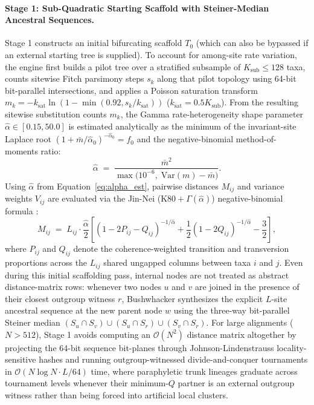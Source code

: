 \documentclass[11pt,a4paper]{article}
\begin{document}
\paragraph{Stage 1: Sub-Quadratic Starting Scaffold with Steiner-Median Ancestral Sequences.}
Stage 1 constructs an initial bifurcating scaffold $T_0$ (which can also be bypassed if an external starting tree is supplied). To account for among-site rate variation, the engine first builds a pilot tree over a stratified subsample of $K_{\text{sub}} \le 128$ taxa, counts sitewise Fitch parsimony steps $s_k$ along that pilot topology using 64-bit bit-parallel intersections, and applies a Poisson saturation transform $m_k = -k_{\text{sat}}\ln(1 - \min(0.92, s_k / k_{\text{sat}}))$ ($k_{\text{sat}} = 0.5 K_{\text{sub}}$). From the resulting sitewise substitution counts $m_k$, the Gamma rate-heterogeneity shape parameter $\hat{\alpha} \in [0.15, 50.0]$ is estimated analytically as the minimum of the invariant-site Laplace root $(1 + \bar{m}/\hat{\alpha}_0)^{-\hat{\alpha}_0} = f_0$ and the negative-binomial method-of-moments ratio:
\begin{equation}
    \hat{\alpha} \;=\; \frac{\bar{m}^2}{\max\!\big(10^{-6},\; \text{Var}(m) - \bar{m}\big)}.
    \label{eq:alpha_est}
\end{equation}
Using $\hat{\alpha}$ from Equation~\eqref{eq:alpha_est}, pairwise distances $M_{ij}$ and variance weights $V_{ij}$ are evaluated via the Jin-Nei ($\text{K80}+\Gamma(\hat{\alpha})$) negative-binomial formula \citep{jin1990limitations}:
\begin{equation}
    M_{ij} \;=\; L_{ij} \cdot \frac{\hat{\alpha}}{2}\left[ (1 - 2P_{ij} - Q_{ij})^{-1/\hat{\alpha}} + \frac{1}{2}(1 - 2Q_{ij})^{-1/\hat{\alpha}} - \frac{3}{2} \right],
    \label{eq:jin_nei}
\end{equation}
where $P_{ij}$ and $Q_{ij}$ denote the coherence-weighted transition and transversion proportions across the $L_{ij}$ shared ungapped columns between taxa $i$ and $j$. Even during this initial scaffolding pass, internal nodes are not treated as abstract distance-matrix rows: whenever two nodes $u$ and $v$ are joined in the presence of their closest outgroup witness $r$, Bushwhacker synthesizes the explicit $L$-site ancestral sequence at the new parent node $w$ using the three-way bit-parallel Steiner median $(S_u \cap S_v) \cup (S_u \cap S_r) \cup (S_v \cap S_r)$. For large alignments ($N > 512$), Stage 1 avoids computing an $\mathcal{O}(N^2)$ distance matrix altogether by projecting the 64-bit sequence bit-planes through Johnson-Lindenstrauss locality-sensitive hashes and running outgroup-witnessed divide-and-conquer tournaments in $\mathcal{O}(N\log N \cdot L / 64)$ time, where paraphyletic trunk lineages graduate across tournament levels whenever their minimum-$Q$ partner is an external outgroup witness rather than being forced into artificial local clusters.
\end{document}
